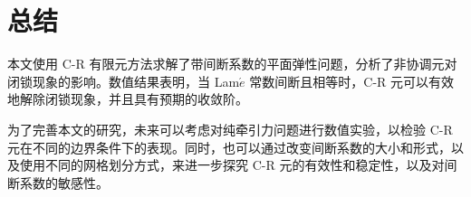 \documentclass[a4paper,UTF8,titlepage]{ctexart}
\begin{document}
\begin{enumerate}
\begin{figure}[h]
	\centering
	\caption{}
\end{figure}

\end{enumerate}

\section{总结}

本文使用 C-R 有限元方法求解了带间断系数的平面弹性问题，分析了非协调元对闭锁现象的影响。数值结果表明，当 Lam$\acute{e}$ 常数间断且相等时，C-R 元可以有效地解除闭锁现象，并且具有预期的收敛阶。

为了完善本文的研究，未来可以考虑对纯牵引力问题进行数值实验，以检验 C-R 元在不同的边界条件下的表现。同时，也可以通过改变间断系数的大小和形式，以及使用不同的网格划分方式，来进一步探究 C-R 元的有效性和稳定性，以及对间断系数的敏感性。

\newpage
\vfill


\clearpage
{}
{}

\end{document}
